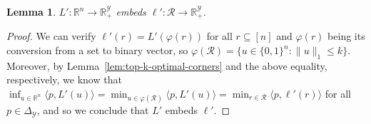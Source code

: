 \documentclass[12pt]{article}
\newcommand{\reals}{\mathbb{R}}
\newcommand{\simplex}{\Delta_\Y}
\newcommand{\R}{\mathcal{R}}
\newcommand{\Y}{\mathcal{Y}}
\newcommand{\inprod}[2]{\langle #1, #2 \rangle}%
\newtheorem{lemma}{Lemma}
\begin{document}
\begin{lemma}\label{lem:top-k-surrogate-embeds}
$L':\reals^n \to \reals^\Y_+$ embeds $\ell':\R \to \reals^\Y_+$.
\end{lemma}
\begin{proof}
  We can verify $\ell'(r) = L'(\varphi(r))$ for all $r \subseteq [n]$ and $\varphi(r)$ being its conversion from a set to binary vector, so $\varphi(\R) = \{ u \in \{0,1\}^n : \|u\|_1 \leq k \}$.
  Moreover, by Lemma~\ref{lem:top-k-optimal-corners} and the above equality, respectively, we know that $\inf_{u \in \reals^n} \inprod{p}{L'(u)} = \min_{u \in \varphi(\R)} \inprod{p}{L'(u)} = \min_{r \in \R}\inprod{p}{\ell'(r)}$ for all $p \in \simplex$, and so we conclude that $L'$ embeds $\ell'$.
\end{proof}
\end{document}
